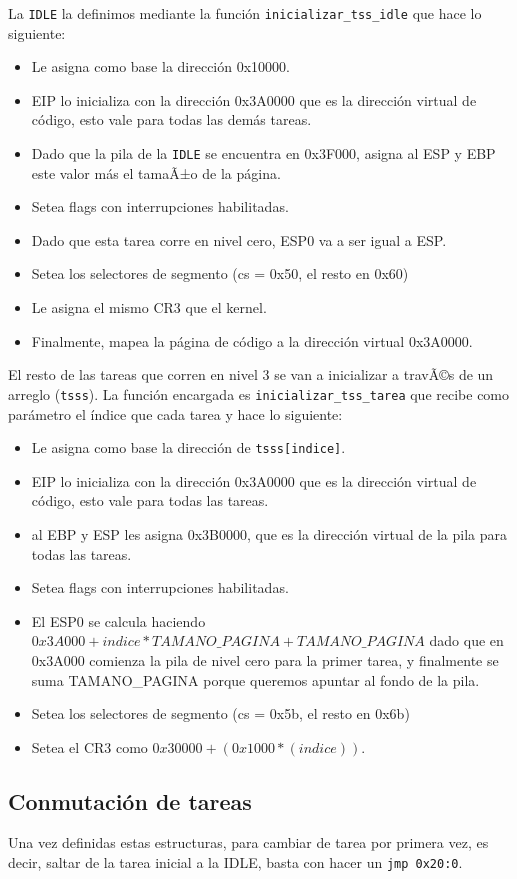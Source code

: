 \documentclass[10pt, a4paper]{article}
\begin{document}
La \texttt{IDLE} la definimos mediante la función \texttt{inicializar\_tss\_idle} que hace lo siguiente:
\begin{itemize}
\item Le asigna como base la dirección 0x10000.
\item EIP lo inicializa con la dirección 0x3A0000 que es la dirección virtual de código, esto vale para todas las demás tareas.
\item Dado que la pila de la \texttt{IDLE} se encuentra en 0x3F000, asigna al ESP y EBP este valor más el tamaÃ±o de la página.
\item Setea flags con interrupciones habilitadas.
\item Dado que esta tarea corre en nivel cero, ESP0 va a ser igual a ESP.
\item Setea los selectores de segmento (cs = 0x50, el resto en 0x60)
\item Le asigna el mismo CR3 que el kernel.
\item Finalmente, mapea la página de código a la dirección virtual 0x3A0000.
\end{itemize} 
El resto de las tareas que corren en nivel 3 se van a inicializar a travÃ©s de un arreglo (\texttt{tsss}).
La función encargada es \texttt{inicializar\_tss\_tarea} que recibe como parámetro el índice que cada tarea 
y hace lo siguiente:
\begin{itemize}
\item Le asigna como base la dirección de \texttt{tsss[indice]}.
\item EIP lo inicializa con la dirección 0x3A0000 que es la dirección virtual de código, esto vale para todas las tareas.
\item al EBP y ESP les asigna 0x3B0000, que es la dirección virtual de la pila para todas las tareas.
\item Setea flags con interrupciones habilitadas.
\item El ESP0 se calcula haciendo \texttt{$0x3A000 + indice*TAMANO\_PAGINA +TAMANO\_PAGINA$} dado que en 0x3A000 comienza la pila de nivel cero para la primer
tarea, y finalmente se suma TAMANO\_PAGINA porque queremos apuntar al fondo de la pila.
\item Setea los selectores de segmento (cs = 0x5b, el resto en 0x6b)
\item Setea el CR3 como \texttt{$0x30000+(0x1000*(indice))$}.
\end{itemize}

\subsection{Conmutación de tareas}
Una vez definidas estas estructuras, para cambiar de tarea por primera vez, es decir, saltar de la tarea inicial a la IDLE, basta con hacer un \texttt{jmp 0x20:0}.
\newpage
\end{document}
